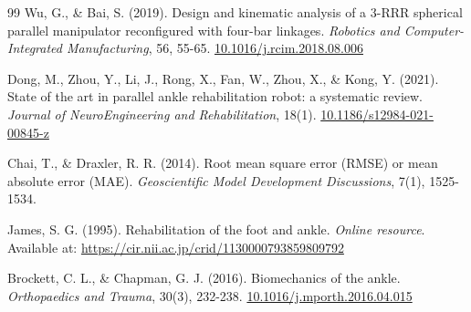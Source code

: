 \documentclass[letterpaper, 10 pt, conference]{ieeeconf}  %
\begin{document}
\begin{thebibliography}{99}
Wu, G., \& Bai, S. (2019). Design and kinematic analysis of a 3-RRR spherical parallel manipulator reconfigured with four-bar linkages. \textit{Robotics and Computer-Integrated Manufacturing}, 56, 55-65. \url{10.1016/j.rcim.2018.08.006}

Dong, M., Zhou, Y., Li, J., Rong, X., Fan, W., Zhou, X., \& Kong, Y. (2021). State of the art in parallel ankle rehabilitation robot: a systematic review. \textit{Journal of NeuroEngineering and Rehabilitation}, 18(1). \url{10.1186/s12984-021-00845-z}

Chai, T., \& Draxler, R. R. (2014). Root mean square error (RMSE) or mean absolute error (MAE). \textit{Geoscientific Model Development Discussions}, 7(1), 1525-1534.

James, S. G. (1995). Rehabilitation of the foot and ankle. \textit{Online resource}. Available at: \url{https://cir.nii.ac.jp/crid/1130000793859809792}

Brockett, C. L., \& Chapman, G. J. (2016). Biomechanics of the ankle. \textit{Orthopaedics and Trauma}, 30(3), 232-238. \url{10.1016/j.mporth.2016.04.015}

\end{thebibliography}
\end{document}
